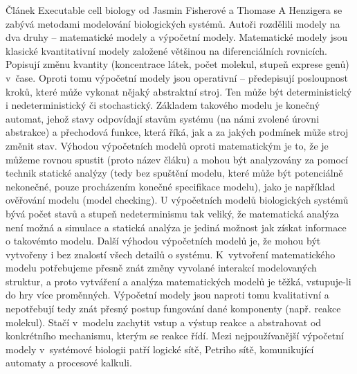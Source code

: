 \documentclass[a4paper]{article}
\begin{document}
\par
Článek Executable cell biology od Jasmin Fisherové a Thomase A Henzigera\cite{Fisher} se zabývá
metodami modelování biologických systémů. Autoři rozdělili modely na dva druhy --
matematické modely a výpočetní modely.
Matematické modely jsou klasické kvantitativní modely založené většinou na diferenciálních rovnicích.
Popisují změnu kvantity (koncentrace látek, počet molekul, stupeň exprese genů) v~čase.
Oproti tomu výpočetní modely jsou operativní -- předepisují posloupnost kroků, které
může vykonat nějaký abstraktní stroj\cite{Fisher}. Ten může být deterministický i nedeterministický
či stochastický. Základem takového modelu je konečný automat, jehož stavy odpovídají stavům systému (na námi zvolené úrovni abstrakce)
a přechodová funkce, která říká, jak a za jakých podmínek může stroj změnit stav.
Výhodou výpočetních modelů oproti matematickým je to, že je můžeme rovnou spustit
(proto název čláku) a mohou být analyzovány za pomocí technik statické analýzy
(tedy bez spuštění modelu, které může být potenciálně nekonečné, pouze procházením
konečné specifikace modelu), jako je například ověřování modelu (model checking).
U výpočetních modelů biologických systémů bývá počet stavů a stupeň nedeterminismu
tak veliký, že matematická analýza není možná\cite{Fisher} a simulace a statická analýza je jediná možnost
jak získat informace o takovémto modelu. Další výhodou výpočetních modelů
je, že mohou být vytvořeny i bez znalostí všech detailů o systému. K~vytvoření
matematického modelu potřebujeme přesně znát změny vyvolané interakcí modelovaných
struktur, a proto vytváření a analýza matematických modelů je těžká, vstupuje-li
do hry více proměnných\cite{Fisher}. Výpočetní modely jsou naproti tomu kvalitativní a nepotřebují
tedy znát přesný postup fungování dané komponenty (např. reakce molekul).
Stačí v~modelu zachytit vstup a výstup reakce a abstrahovat od konkrétního mechanismu,
kterým se reakce řídí\cite{Fisher}. Mezi nejpoužívanější výpočetní modely
v~systémové biologii patří logické sítě, Petriho sítě, komunikující automaty a procesové kalkuli.
\end{document}
